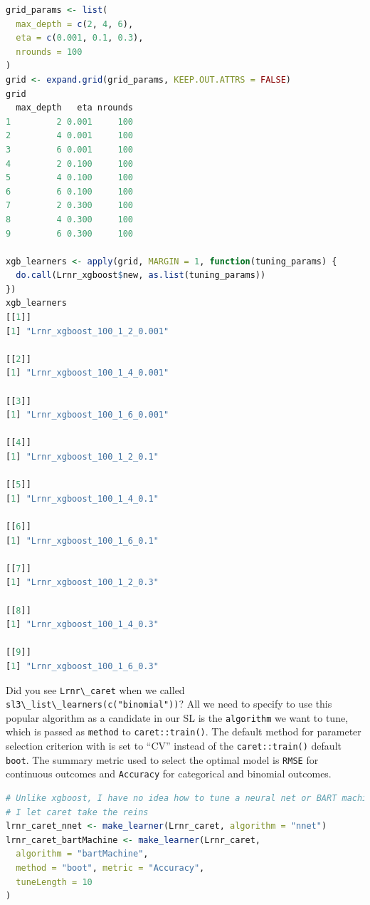 \documentclass[12pt, krantz2,]{krantz}
\newcommand{\passthrough}[1]{#1}
\theoremstyle{definition}
\theoremstyle{definition}
\theoremstyle{definition}
\newcommand{\1}{\mathbbm{1}}
\begin{document}
\begin{lstlisting}[language=R]
grid_params <- list(
  max_depth = c(2, 4, 6),
  eta = c(0.001, 0.1, 0.3),
  nrounds = 100
)
grid <- expand.grid(grid_params, KEEP.OUT.ATTRS = FALSE)
grid
  max_depth   eta nrounds
1         2 0.001     100
2         4 0.001     100
3         6 0.001     100
4         2 0.100     100
5         4 0.100     100
6         6 0.100     100
7         2 0.300     100
8         4 0.300     100
9         6 0.300     100

xgb_learners <- apply(grid, MARGIN = 1, function(tuning_params) {
  do.call(Lrnr_xgboost$new, as.list(tuning_params))
})
xgb_learners
[[1]]
[1] "Lrnr_xgboost_100_1_2_0.001"

[[2]]
[1] "Lrnr_xgboost_100_1_4_0.001"

[[3]]
[1] "Lrnr_xgboost_100_1_6_0.001"

[[4]]
[1] "Lrnr_xgboost_100_1_2_0.1"

[[5]]
[1] "Lrnr_xgboost_100_1_4_0.1"

[[6]]
[1] "Lrnr_xgboost_100_1_6_0.1"

[[7]]
[1] "Lrnr_xgboost_100_1_2_0.3"

[[8]]
[1] "Lrnr_xgboost_100_1_4_0.3"

[[9]]
[1] "Lrnr_xgboost_100_1_6_0.3"
\end{lstlisting}

Did you see \passthrough{\lstinline!Lrnr\_caret!} when we called \passthrough{\lstinline!sl3\_list\_learners(c("binomial"))!}?
All we need to specify to use this popular algorithm as a candidate in our
SL is the \passthrough{\lstinline!algorithm!} we want to tune, which is passed as \passthrough{\lstinline!method!} to
\passthrough{\lstinline!caret::train()!}. The default method for parameter selection criterion with is
set to ``CV'' instead of the \passthrough{\lstinline!caret::train()!} default \passthrough{\lstinline!boot!}. The summary metric
used to select the optimal model is \passthrough{\lstinline!RMSE!} for continuous outcomes and
\passthrough{\lstinline!Accuracy!} for categorical and binomial outcomes.

\begin{lstlisting}[language=R]
# Unlike xgboost, I have no idea how to tune a neural net or BART machine, so
# I let caret take the reins
lrnr_caret_nnet <- make_learner(Lrnr_caret, algorithm = "nnet")
lrnr_caret_bartMachine <- make_learner(Lrnr_caret,
  algorithm = "bartMachine",
  method = "boot", metric = "Accuracy",
  tuneLength = 10
)
\end{lstlisting}
\end{document}
